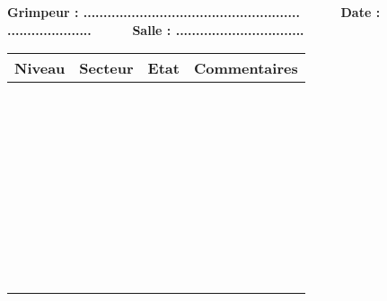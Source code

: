 \documentclass[a4paper]{article}
\begin{document}
\pagestyle{empty}

\begin{center}
\textbf{Grimpeur : ...................................................... \ \ \ \ \ Date : ..................... \ \ \ \ \ Salle : ................................}\\
\end{center}

\begin{minipage}{5cm}
\renewcommand{\arraystretch}{.8}
\begin{tabular}{|p{1cm}|p{2.2cm}|p{.7cm}|p{3cm}|}
\hline
Niveau & Secteur & Etat \footnotemark & Commentaires \\
\hline
&&&\\
&&&\\
\hline
&&&\\
&&&\\
\hline
&&&\\
&&&\\
\hline
&&&\\
&&&\\
\hline
&&&\\
&&&\\
\hline
&&&\\
&&&\\
\hline
&&&\\
&&&\\
\hline
&&&\\
&&&\\
\hline
&&&\\
&&&\\
\hline
&&&\\
&&&\\
\hline
&&&\\
&&&\\
\hline
&&&\\
&&&\\
\hline
&&&\\
&&&\\
\hline
&&&\\
&&&\\
\hline
&&&\\
&&&\\
\hline
&&&\\
&&&\\
\hline
&&&\\
&&&\\
\hline
&&&\\
&&&\\
\hline
&&&\\
&&&\\
\hline
&&&\\

\end{tabular}
\end{minipage}
\end{document}
